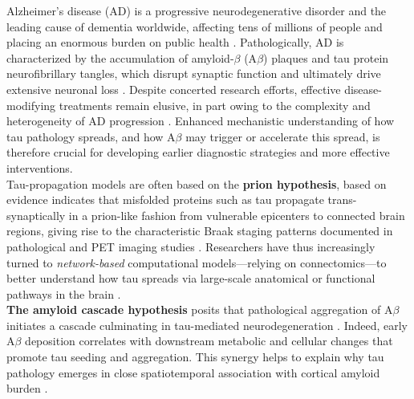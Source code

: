 Alzheimer’s disease (AD) is a progressive neurodegenerative disorder and the leading cause of dementia worldwide, affecting tens of millions of people and placing an enormous burden on public health \citep{yuHumanConnectomeAlzheimer2021}. Pathologically, AD is characterized by the accumulation of amyloid-$\beta$ (A$\beta$) plaques and tau protein neurofibrillary tangles, which disrupt synaptic function and ultimately drive extensive neuronal loss \citep{goedertAlzheimersParkinsonsDiseases2015, weickenmeierPhysicsbasedModelExplains2019}. Despite concerted research efforts, effective disease-modifying treatments remain elusive, in part owing to the complexity and heterogeneity of AD progression \citep{yuHumanConnectomeAlzheimer2021}. Enhanced mechanistic understanding of how tau pathology spreads, and how A$\beta$ may trigger or accelerate this spread, is therefore crucial for developing earlier diagnostic strategies and more effective interventions. \\

 Tau-propagation models are often based on the \textbf{prion hypothesis}, based on evidence indicates that misfolded proteins such as tau propagate trans-synaptically in a prion-like fashion from vulnerable epicenters to connected brain regions, giving rise to the characteristic Braak staging patterns documented in pathological and PET imaging studies \citep{vogelConnectomebasedModellingNeurodegenerative2023, rajNetworkDiffusionModel2012}. Researchers have thus increasingly turned to \emph{network-based} computational models—relying on connectomics—to better understand how tau spreads via large-scale anatomical or functional pathways in the brain \citep{rajNetworkDiffusionModel2012,toxtobyDataDrivenSequenceChanges2017,weickenmeierPhysicsbasedModelExplains2019,heCoupledmechanismsModellingFramework2023, hompsonCombiningMultimodalConnectivity2024}.\\

 \textbf{The amyloid cascade hypothesis} posits that pathological aggregation of A$\beta$ initiates a cascade culminating in tau-mediated neurodegeneration \citep{goedertAlzheimersParkinsonsDiseases2015}. Indeed, early A$\beta$ deposition correlates with downstream metabolic and cellular changes that promote tau seeding and aggregation. This synergy helps to explain why tau pathology emerges in close spatiotemporal association with cortical amyloid burden \citep{bielCombiningTauPETFMRI2022}.\\

